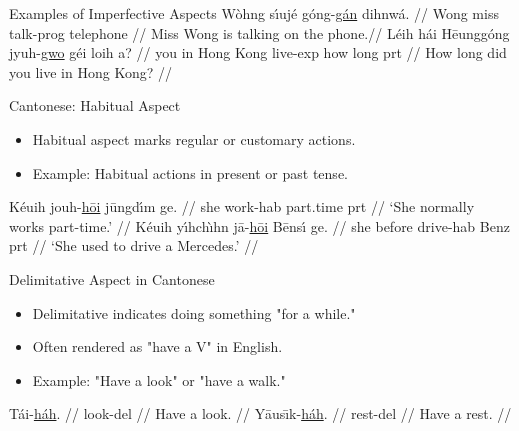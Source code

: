 \documentclass{beamer}
\newcommand{\cmn}{\mtciteform}
\newcommand{\ul}[1]{\uline{#1}}
\begin{document}

\begin{frame}{Examples of Imperfective Aspects}
\ex
\begingl
\gla Wòhng sı́ujé góng-\ul{gán} dihnwá. //
\glb Wong miss talk-prog telephone //
\glft Miss Wong is talking on the phone.//
\endgl
\xe
\ex
\begingl
\gla Léih hái Hēunggóng jyuh-\ul{gwo} géi loih a? //
\glb you in Hong Kong live-exp how long prt //
\glft How long did you live in Hong Kong? //
\endgl
\xe
\end{frame}

\begin{frame}{Cantonese: Habitual Aspect}
\begin{itemize}
    \item Habitual aspect \cmn{hōi} marks regular or customary actions.
    \item Example: Habitual actions in present or past tense.
\end{itemize}
\ex
\begingl
\gla Kéuih jouh-\ul{hōi} jūngdı́m ge. //
\glb she work-hab part.time prt //
\glft ‘She normally works part-time.’ //
\endgl
\xe
\ex
\begingl
\gla Kéuih yı́hchı̀hn jā-\ul{hōi} Bēnsı́ ge. //
\glb she before drive-hab Benz prt //
\glft ‘She used to drive a Mercedes.’ //
\endgl
\xe
\end{frame}

\begin{frame}{Delimitative Aspect in Cantonese}
\begin{itemize}
    \item Delimitative \cmn{háh} indicates doing something "for a while."
    \item Often rendered as "have a V" in English.
    \item Example: "Have a look" or "have a walk."
\end{itemize}
\ex
\begingl
\gla Tái-\ul{háh}. //
\glb look-del //
\glft Have a look. //
\endgl
\xe
\ex
\begingl
\gla Yāusı̄k-\ul{háh}. //
\glb rest-del //
\glft Have a rest. //
\endgl
\xe
\end{frame}
\end{document}

